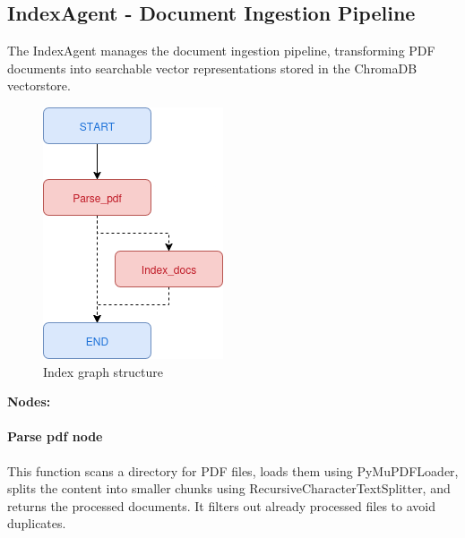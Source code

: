 \documentclass[11pt,a4paper]{report}
\begin{document}
\subsection{IndexAgent - Document Ingestion Pipeline}

The IndexAgent manages the document ingestion pipeline, transforming PDF documents into searchable vector representations stored in the ChromaDB vectorstore.

\begin{figure}[H]
    \centering
    \includegraphics[width=0.3\linewidth]{static/schemas/indexGraph.drawio.png}
    \caption{Index graph structure}
    \label{fig:indexGraph}
\end{figure}

\textbf{Nodes:}\\

\paragraph{Parse pdf node}

This function scans a directory for PDF files, loads them using PyMuPDFLoader, splits the content into smaller chunks using RecursiveCharacterTextSplitter, and returns the processed documents. It filters out already processed files to avoid duplicates.
\end{document}
